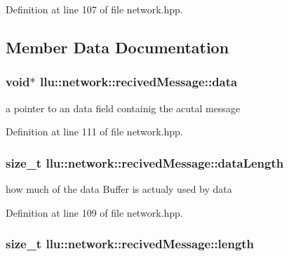 Definition at line 107 of file network.\+hpp.



\subsection{Member Data Documentation}
\hypertarget{structllu_1_1network_1_1recived_message_a26f9f75bd002582bcf4c6624cbbdb1fb}{
\subsubsection[{data}]{\setlength{\rightskip}{0pt plus 5cm}void$\ast$ llu\+::network\+::recived\+Message\+::data}}\label{structllu_1_1network_1_1recived_message_a26f9f75bd002582bcf4c6624cbbdb1fb}


a pointer to an data field containig the acutal message 



Definition at line 111 of file network.\+hpp.

\hypertarget{structllu_1_1network_1_1recived_message_a01a039e5ee47a330b32c2b419d25cfd6}{
\subsubsection[{data\+Length}]{\setlength{\rightskip}{0pt plus 5cm}size\+\_\+t llu\+::network\+::recived\+Message\+::data\+Length}}\label{structllu_1_1network_1_1recived_message_a01a039e5ee47a330b32c2b419d25cfd6}


how much of the data Buffer is actualy used by data 



Definition at line 109 of file network.\+hpp.

\hypertarget{structllu_1_1network_1_1recived_message_a6afc4099f30c393381c79c72d5093d8a}{
\subsubsection[{length}]{\setlength{\rightskip}{0pt plus 5cm}size\+\_\+t llu\+::network\+::recived\+Message\+::length}}\label{structllu_1_1network_1_1recived_message_a6afc4099f30c393381c79c72d5093d8a}



